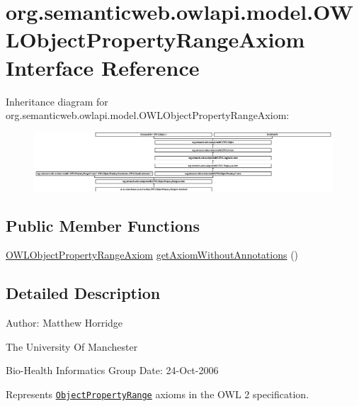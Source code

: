 \hypertarget{interfaceorg_1_1semanticweb_1_1owlapi_1_1model_1_1_o_w_l_object_property_range_axiom}{\section{org.\-semanticweb.\-owlapi.\-model.\-O\-W\-L\-Object\-Property\-Range\-Axiom Interface Reference}
\label{interfaceorg_1_1semanticweb_1_1owlapi_1_1model_1_1_o_w_l_object_property_range_axiom}
}
Inheritance diagram for org.\-semanticweb.\-owlapi.\-model.\-O\-W\-L\-Object\-Property\-Range\-Axiom\-:\begin{figure}[H]
\begin{center}
\leavevmode
\includegraphics[height=2.192854cm]{interfaceorg_1_1semanticweb_1_1owlapi_1_1model_1_1_o_w_l_object_property_range_axiom}
\end{center}
\end{figure}
\subsection*{Public Member Functions}
\begin{DoxyCompactItemize}
\item 
\hyperlink{interfaceorg_1_1semanticweb_1_1owlapi_1_1model_1_1_o_w_l_object_property_range_axiom}{O\-W\-L\-Object\-Property\-Range\-Axiom} \hyperlink{interfaceorg_1_1semanticweb_1_1owlapi_1_1model_1_1_o_w_l_object_property_range_axiom_ad1c06f1623745869c17e893351df8738}{get\-Axiom\-Without\-Annotations} ()
\end{DoxyCompactItemize}


\subsection{Detailed Description}
Author\-: Matthew Horridge\par
 The University Of Manchester\par
 Bio-\/\-Health Informatics Group Date\-: 24-\/\-Oct-\/2006 

Represents \href{http://www.w3.org/TR/2009/REC-owl2-syntax-20091027/#Object_Property_Range}{\tt Object\-Property\-Range} axioms in the O\-W\-L 2 specification. 

